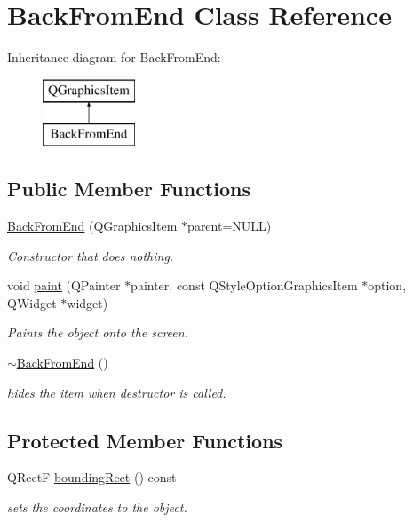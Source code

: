 \hypertarget{class_back_from_end}{\section{Back\-From\-End Class Reference}
\label{class_back_from_end}
}
Inheritance diagram for Back\-From\-End\-:\begin{figure}[H]
\begin{center}
\leavevmode
\includegraphics[height=2.000000cm]{class_back_from_end}
\end{center}
\end{figure}
\subsection*{Public Member Functions}
\begin{DoxyCompactItemize}
\item 
\hyperlink{class_back_from_end_a64a9aa1b79a4b24dc8f770119380bcf0}{Back\-From\-End} (Q\-Graphics\-Item $\ast$parent=N\-U\-L\-L)
\begin{DoxyCompactList}\small\item\em Constructor that does nothing. \end{DoxyCompactList}\item 
void \hyperlink{class_back_from_end_a69972808b1eacfa0fbe2021c8db14a54}{paint} (Q\-Painter $\ast$painter, const Q\-Style\-Option\-Graphics\-Item $\ast$option, Q\-Widget $\ast$widget)
\begin{DoxyCompactList}\small\item\em Paints the object onto the screen. \end{DoxyCompactList}\item 
\hypertarget{class_back_from_end_ad61e8913026f3741a5b2918e84ce1890}{\hyperlink{class_back_from_end_ad61e8913026f3741a5b2918e84ce1890}{$\sim$\-Back\-From\-End} ()}\label{class_back_from_end_ad61e8913026f3741a5b2918e84ce1890}

\begin{DoxyCompactList}\small\item\em hides the item when destructor is called. \end{DoxyCompactList}\end{DoxyCompactItemize}
\subsection*{Protected Member Functions}
\begin{DoxyCompactItemize}
\item 
Q\-Rect\-F \hyperlink{class_back_from_end_a30bf2628ade3dd6e43eb23ba235327db}{bounding\-Rect} () const 
\begin{DoxyCompactList}\small\item\em sets the coordinates to the object. \end{DoxyCompactList}\end{DoxyCompactItemize}


